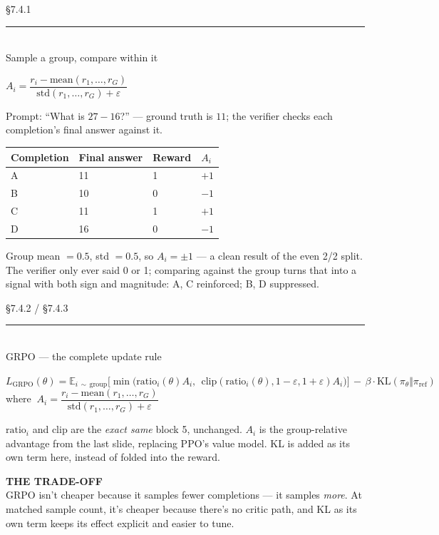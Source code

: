 \documentclass[aspectratio=169,11pt]{beamer}
\newcommand{\eyebrow}[2]{%
  \noindent{\scriptsize\sffamily\color{inkdim}\MakeUppercase{#1}}\hfill{\scriptsize\ttfamily\color{accentB}#2}\\[3pt]
  {\color{linecol}\rule{\linewidth}{0.6pt}}\\[13pt]%
}
\newcommand{\headline}[1]{{\usefont{T1}{ppl}{b}{n}\selectfont\LARGE\color{ink} #1}\par\vspace{10pt}}
\newcommand{\clabel}[2]{{\small\sffamily\bfseries\color{#1}\MakeUppercase{#2}}\\[4pt]}
\begin{document}
\begin{frame}
\eyebrow{GRPO \textperiodcentered\ 24}{\S7.4.1}
\headline{Sample a group, compare within it}
\begin{eqbox}[fontupper=\normalsize]
$A_i = \dfrac{r_i - \text{mean}(r_1,\dots,r_G)}{\text{std}(r_1,\dots,r_G) + \varepsilon}$
\end{eqbox}
\vspace{5pt}
{\small\color{inkdim}Prompt: ``What is $27-16$?'' --- ground truth is $11$; the verifier checks each completion's final answer against it.}
\vspace{4pt}
\small
\begin{tabular}{@{} l l l l @{}}
\toprule
\textbf{Completion} & \textbf{Final answer} & \textbf{Reward} & \textbf{$A_i$} \\
\midrule
\color{accentB}A & 11 & 1 & $+1$ \\
\color{neg}B & 10 & 0 & $-1$ \\
\color{accentB}C & 11 & 1 & $+1$ \\
\color{neg}D & 16 & 0 & $-1$ \\
\bottomrule
\end{tabular}
\par\vspace{6pt}
{\small\color{ink}Group mean $=0.5$, std $=0.5$, so $A_i=\pm1$ --- a clean result of the even 2/2 split. The verifier only ever said 0 or 1; comparing against the group turns that into a signal with both sign and magnitude: A, C reinforced; B, D suppressed.}
\end{frame}

\begin{frame}
\eyebrow{GRPO \textperiodcentered\ 25}{\S7.4.2 / \S7.4.3}
\headline{GRPO --- the complete update rule}
\begin{eqbox}[fontupper=\normalsize,top=9pt,bottom=9pt]
$L_{\text{GRPO}}(\theta) = \mathbb{E}_{i\,\sim\,\text{group}}\Big[\min\big(\text{ratio}_i(\theta)A_i,\ \ \text{clip}(\text{ratio}_i(\theta),1{-}\varepsilon,1{+}\varepsilon)A_i\big)\Big] \,-\, \beta\cdot\mathrm{KL}(\pi_\theta\Vert\pi_{\text{ref}})$\\[8pt]
{\small where $\ A_i = \dfrac{r_i-\text{mean}(r_1,\dots,r_G)}{\text{std}(r_1,\dots,r_G)+\varepsilon}$}
\end{eqbox}
\par\vspace{9pt}
{\small\color{ink}$\text{ratio}_i$ and $\text{clip}$ are the \textit{exact same} block 5, unchanged. $A_i$ is the group-relative advantage from the last slide, replacing PPO's value model. KL is added as its own term here, instead of folded into the reward.}
\par\vspace{9pt}
\begin{callout}
\clabel{accentB}{The trade-off}
{\small\color{ink}GRPO isn't cheaper because it samples fewer completions --- it samples \textit{more}. At matched sample count, it's cheaper because there's no critic path, and KL as its own term keeps its effect explicit and easier to tune.}
\end{callout}
\end{frame}
\end{document}
